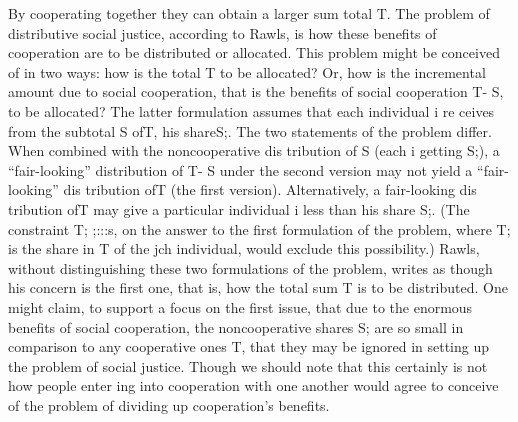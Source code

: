 \documentclass[11pt,openany]{book}
\begin{document}
By cooperating together they can obtain a larger sum total T. The problem of distributive social justice, according to Rawls, is how these benefits of cooperation are to be distributed or allocated. This problem might be conceived of in two ways: how is the total T to be allocated? Or, how is the incremental amount due to social cooperation, that is the benefits of social cooperation T- S, to be allocated? The latter formulation assumes that each individual i re ceives from the subtotal S ofT, his shareS;. The two statements of the problem differ. When combined with the noncooperative dis tribution of S (each i getting S;), a ``fair-looking'' distribution of T- S under the second version may not yield a ``fair-looking'' dis tribution ofT (the first version). Alternatively, a fair-looking dis tribution ofT may give a particular individual i less than his share S;. (The constraint T; ;:::s, on the answer to the first formulation of the problem, where T; is the share in T of the jch individual, would exclude this possibility.) Rawls, without distinguishing these two formulations of the problem, writes as though his concern is the first one, that is, how the total sum T is to be distributed. One might claim, to support a focus on the first issue, that due to the enormous benefits of social cooperation, the noncooperative shares S; are so small in comparison to any cooperative ones T, that they may be ignored in setting up the problem of social justice. Though we should note that this certainly is not how people enter ing into cooperation with one another would agree to conceive of the problem of dividing up cooperation's benefits. 
\end{document}
